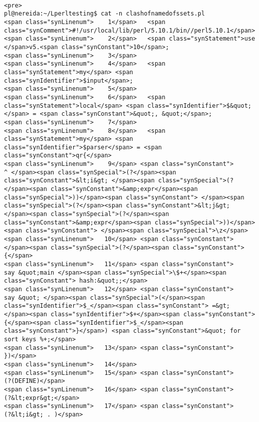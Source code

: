 \begin{verbatim}

<pre>
pl@nereida:~/Lperltesting$ cat -n clashofnamedofssets.pl
<span class="synLinenum">    1</span>   <span class="synComment">#!/usr/local/lib/perl/5.10.1/bin//perl5.10.1</span>
<span class="synLinenum">    2</span>   <span class="synStatement">use </span>v5.<span class="synConstant">10</span>;
<span class="synLinenum">    3</span> 
<span class="synLinenum">    4</span>   <span class="synStatement">my</span> <span class="synIdentifier">$input</span>;
<span class="synLinenum">    5</span> 
<span class="synLinenum">    6</span>   <span class="synStatement">local</span> <span class="synIdentifier">$&quot;</span> = <span class="synConstant">&quot;, &quot;</span>;
<span class="synLinenum">    7</span> 
<span class="synLinenum">    8</span>   <span class="synStatement">my</span> <span class="synIdentifier">$parser</span> = <span class="synConstant">qr{</span>
<span class="synLinenum">    9</span> <span class="synConstant">      ^ </span><span class="synSpecial">(?</span><span class="synConstant">&lt;i&gt; </span><span class="synSpecial">(?</span><span class="synConstant">&amp;expr</span><span class="synSpecial">))</span><span class="synConstant"> </span><span class="synSpecial">(?</span><span class="synConstant">&lt;j&gt; </span><span class="synSpecial">(?</span><span class="synConstant">&amp;expr</span><span class="synSpecial">))</span><span class="synConstant"> </span><span class="synSpecial">\z</span>
<span class="synLinenum">   10</span> <span class="synConstant">        </span><span class="synSpecial">(?</span><span class="synConstant">{</span>
<span class="synLinenum">   11</span> <span class="synConstant">             say &quot;main </span><span class="synSpecial">\$+</span><span class="synConstant"> hash:&quot;;</span>
<span class="synLinenum">   12</span> <span class="synConstant">             say &quot; </span><span class="synSpecial">(</span><span class="synIdentifier">$_</span><span class="synConstant"> =&gt; </span><span class="synIdentifier">$+</span><span class="synConstant">{</span><span class="synIdentifier">$_</span><span class="synConstant">}</span>) <span class="synConstant">&quot; for sort keys %+;</span>
<span class="synLinenum">   13</span> <span class="synConstant">         })</span>
<span class="synLinenum">   14</span> 
<span class="synLinenum">   15</span> <span class="synConstant">      (?(DEFINE)</span>
<span class="synLinenum">   16</span> <span class="synConstant">          (?&lt;expr&gt;</span>
<span class="synLinenum">   17</span> <span class="synConstant">              (?&lt;i&gt; . )</span>

\end{verbatim}
